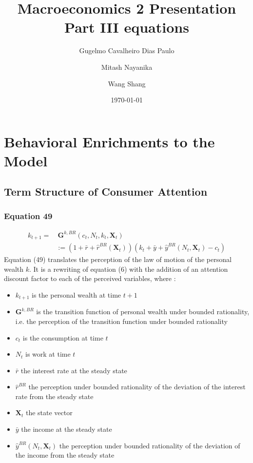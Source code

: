 \documentclass{article}
\title{Macroeconomics 2 Presentation \\ Part III equations}
\author{Gugelmo Cavalheiro Dias Paulo \\ \and Mitash Nayanika \\ \and Wang Shang}
\date{\today}
\begin{document}
\maketitle

\section{Behavioral Enrichments to the Model}

\subsection{Term Structure of Consumer Attention}

\subsubsection*{Equation 49}

\begin{equation} \tag{49}
    \begin{split}
        k_{t+1}= &\  \textbf{G}^{k,BR}(c_{t},N_{t},k_{t},\textbf{X}_{t}) \\
        & := (1+\bar{r}+\hat{r}^{BR}(\textbf{X}_t))(k_{t}+\bar{y}+\hat{y}^{BR}(N_{t},\textbf{X}_t)-c_{t})
    \end{split}
\end{equation}
Equation (49) translates the perception of the law of motion of the personal wealth $k$. It is a rewriting of equation (6) with the addition of an attention discount factor to each of the perceived variables, where : 
\begin{itemize}
    \item $k_{t+1}$ is the personal wealth at time $t+1$
    \item $\textbf{G}^{k,BR}$ is the transition function of personal wealth under bounded rationality, i.e. the perception of the transition function under bounded rationality
    \item $c_t$ is the consumption at time $t$
    \item $N_{t}$ is work at time $t$
    \item $\bar{r}$ the interest rate at the steady state
    \item $\hat{r}^{BR}$ the perception under bounded rationality of the deviation of the interest rate from the steady state 
    \item $\textbf{X}_t$ the state vector
    \item $\bar{y}$ the income at the steady state 
    \item $\hat{y}^{BR}(N_t,\textbf{X}_{t})$ the perception under bounded rationality of the deviation of the income from the steady state
\end{itemize}
\end{document}

